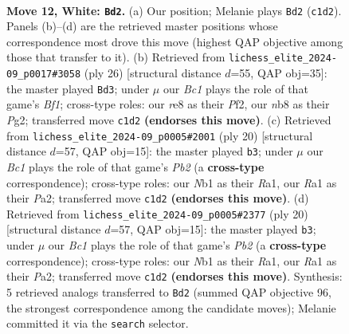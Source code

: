 \documentclass[11pt]{article}
\begin{document}
\clearpage

\begin{figure}[p]\centering
\begin{subfigure}{0.46\textwidth}\centering
\resizebox{\linewidth}{!}{%
\newchessgame
\chessboard[
  setfen={rnb1r3/1pk2ppp/4pn2/p1b5/P6P/1B2PN2/1P3PP1/RNB2RK1 w - - 1 12},
  showmover=false,
  pgfstyle=straightmove, color=movearrow, markmove={c1-d2}
]}
\caption{}
\end{subfigure}\hfill
\begin{subfigure}{0.46\textwidth}\centering
\resizebox{\linewidth}{!}{%
\newchessgame
\chessboard[
  setfen={rn3rk1/1p2ppbp/2p3p1/p4b2/2PP4/1N2B3/PP3PPP/2KR1B1R w - - 0 14},
  showmover=false,
  pgfstyle=straightmove, color=movearrow, markmove={f1-d3}
]}
\caption{}
\end{subfigure}
\\[4pt]
\begin{subfigure}{0.46\textwidth}\centering
\resizebox{\linewidth}{!}{%
\newchessgame
\chessboard[
  setfen={r2k1b1r/pppb1pp1/2p4p/4Pn2/8/2N2N1P/PPP2PP1/R1B2RK1 w - - 0 11},
  showmover=false,
  pgfstyle=straightmove, color=movearrow, markmove={b2-b3}
]}
\caption{}
\end{subfigure}\hfill
\begin{subfigure}{0.46\textwidth}\centering
\resizebox{\linewidth}{!}{%
\newchessgame
\chessboard[
  setfen={r2k1b1r/pppb1pp1/2p4p/4Pn2/8/2N2N1P/PPP2PP1/R1B2RK1 w - - 0 11},
  showmover=false,
  pgfstyle=straightmove, color=movearrow, markmove={b2-b3}
]}
\caption{}
\end{subfigure}
\caption{\textbf{Move 12, White: \texttt{Bd2}.} (a) Our position; Melanie plays \texttt{Bd2} (\texttt{c1d2}). Panels (b)--(d) are the retrieved master positions whose correspondence most drove this move (highest QAP objective among those that transfer to it). (b) Retrieved from \texttt{lichess\_elite\_2024-09\_p0017\#3058} (ply 26) [structural distance $d$=55, QAP obj=35]: the master played \texttt{Bd3}; under $\mu$ our \emph{Bc1} plays the role of that game's \emph{Bf1}; cross-type roles: our \emph{r}e8 as their \emph{P}f2, our \emph{n}b8 as their \emph{P}g2; transferred move \texttt{c1d2} \textbf{(endorses this move)}. (c) Retrieved from \texttt{lichess\_elite\_2024-09\_p0005\#2001} (ply 20) [structural distance $d$=57, QAP obj=15]: the master played \texttt{b3}; under $\mu$ our \emph{Bc1} plays the role of that game's \emph{Pb2} (a \textbf{cross-type} correspondence); cross-type roles: our \emph{N}b1 as their \emph{R}a1, our \emph{R}a1 as their \emph{P}a2; transferred move \texttt{c1d2} \textbf{(endorses this move)}. (d) Retrieved from \texttt{lichess\_elite\_2024-09\_p0005\#2377} (ply 20) [structural distance $d$=57, QAP obj=15]: the master played \texttt{b3}; under $\mu$ our \emph{Bc1} plays the role of that game's \emph{Pb2} (a \textbf{cross-type} correspondence); cross-type roles: our \emph{N}b1 as their \emph{R}a1, our \emph{R}a1 as their \emph{P}a2; transferred move \texttt{c1d2} \textbf{(endorses this move)}. Synthesis: 5 retrieved analogs transferred to \texttt{Bd2} (summed QAP objective 96, the strongest correspondence among the candidate moves); Melanie committed it via the \texttt{search} selector.}
\label{fig:thought-m22}
\end{figure}
\end{document}
